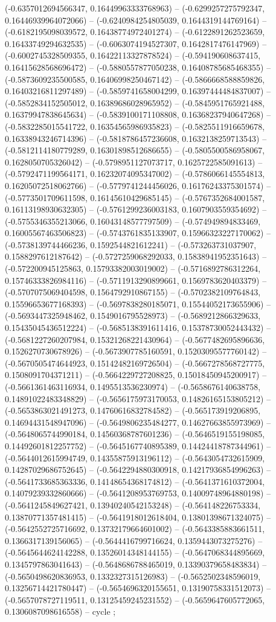 (-0.6357012694566347, 0.16449963333768963) -- (-0.6299257275792347, 0.16446939964072066) -- (-0.6240984254805039, 0.1644319144769164) -- (-0.6182195098039572, 0.16438774972401274) -- (-0.6122891262523659, 0.16433749294632535) -- (-0.6063074194527307, 0.1642817476147969) -- (-0.6002745328509355, 0.16422113327878524) -- (-0.594190608637415, 0.16415628568696472) -- (-0.5880557877050238, 0.16408785685468355) -- (-0.5873609235500585, 0.16406998250467142) -- (-0.5866668588859826, 0.16403216811297489) -- (-0.5859741658004299, 0.16397444484837007) -- (-0.5852834152505012, 0.16389686028965952) -- (-0.5845951765921488, 0.16379947838645634) -- (-0.5839100171108808, 0.16368237940647268) -- (-0.5832285015541722, 0.16354565986935823) -- (-0.5825511916659678, 0.16338943246714396) -- (-0.5818786457236608, 0.1632138259713543) -- (-0.5812114180779289, 0.16301898512686655) -- (-0.5805500586958067, 0.1628050705326042) -- (-0.5798951127073717, 0.1625722585091613) -- (-0.5792471199564171, 0.16232074095347002) -- (-0.5786066145554813, 0.16205072518062766) -- (-0.5779741244456026, 0.16176243375301574) -- (-0.5773501709611598, 0.16145610429685145) -- (-0.5767352684001587, 0.16113198930632305) -- (-0.5761299236003183, 0.1607903559354692) -- (-0.5755346355213066, 0.16043148577797509) -- (-0.574949894833469, 0.16005567463506823) -- (-0.5743761835133907, 0.15966323227170062) -- (-0.5738139744466236, 0.1592544821612241) -- (-0.573263731037907, 0.1588297612187642) -- (-0.5727259068292033, 0.15838941952351643) -- (-0.572200945125863, 0.15793382003019002) -- (-0.5716892786312264, 0.15746333826984116) -- (-0.5711913290899661, 0.1569783620403379) -- (-0.5707075069404598, 0.1564792910867155) -- (-0.5702382109764843, 0.15596653677168393) -- (-0.5697838280185071, 0.15544052173655906) -- (-0.5693447325948462, 0.1549016795528973) -- (-0.5689212866329633, 0.15435045436512224) -- (-0.5685138391611416, 0.15378730052443432) -- (-0.5681227260207984, 0.15321268221430964) -- (-0.5677482695896636, 0.1526270730678926) -- (-0.5673907785160591, 0.15203095577760142) -- (-0.5670505474644923, 0.15142482169726504) -- (-0.5667278568727775, 0.1508091704371211) -- (-0.5664229727208825, 0.15018450945200917) -- (-0.5661361463116934, 0.1495513536230974) -- (-0.5658676140638758, 0.14891022483348829) -- (-0.5656175973170053, 0.14826165153805212) -- (-0.5653863021491273, 0.14760616832784582) -- (-0.565173919206895, 0.14694431548947096) -- (-0.5649806235484277, 0.14627663855973969) -- (-0.5648065744990184, 0.14560368787601236) -- (-0.5646519155198085, 0.14492601812257752) -- (-0.5645167740895389, 0.14424418787344961) -- (-0.5644012615994749, 0.14355875913196112) -- (-0.5643054732615909, 0.14287029686752645) -- (-0.5642294880300918, 0.14217936854996263) -- (-0.5641733685363336, 0.14148654368174812) -- (-0.5641371610372004, 0.14079239332860666) -- (-0.5641208953769753, 0.14009748964880198) -- (-0.5641245849627421, 0.13940240542153248) -- (-0.564148226753334, 0.13870771357481415) -- (-0.5641918012618404, 0.13801398671324075) -- (-0.5642552725716692, 0.13732179664601002) -- (-0.5643385883661511, 0.1366317139156065) -- (-0.5644416799716624, 0.1359443073275276) -- (-0.5645644624142288, 0.13526014348144155) -- (-0.5647068344895669, 0.1345797863041643) -- (-0.5648686788465019, 0.13390379658483834) -- (-0.5650498620836953, 0.1332327315126983) -- (-0.5652502348596019, 0.13256714421780447) -- (-0.5654696320155651, 0.13190758331512073) -- (-0.5657078727119511, 0.13125459245231552) -- (-0.5659647605772065, 0.1306087098616558) -- cycle
;